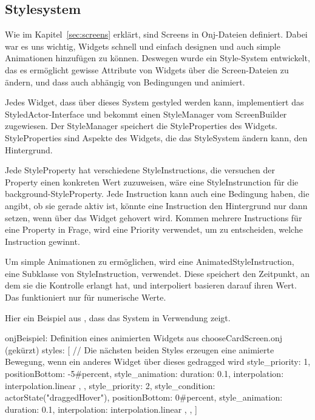 
\subsection{Stylesystem}\label{subsec:stylesystem}

\renewcommand{\kapitelautor}{Autor: Marvin Kurka}

Wie im Kapitel~\ref{sec:screens} erklärt, sind Screens in Onj-Dateien definiert.
Dabei war es uns wichtig, Widgets schnell und einfach designen und auch simple Animationen hinzufügen zu können.
Deswegen wurde ein Style-System entwickelt, das es ermöglicht gewisse Attribute von Widgets über die Screen-Dateien
zu ändern, und dass auch abhängig von Bedingungen und animiert.

Jedes Widget, dass über dieses System gestyled werden kann, implementiert das StyledActor-Interface und
bekommt einen StyleManager vom ScreenBuilder zugewiesen.
Der StyleManager speichert die StyleProperties des Widgets.
StyleProperties sind Aspekte des Widgets, die das StyleSystem ändern kann, \zB den Hintergrund.

Jede StyleProperty hat verschiedene StyleInstructions, die versuchen der Property einen konkreten Wert zuzuweisen,
\zB {} wäre eine StyleInstrunction für die background-StyleProperty.
Jede Instruction kann auch eine Bedingung haben, die angibt, ob sie gerade aktiv ist, \zB könnte eine Instruction
den Hintergrund nur dann setzen, wenn über das Widget gehovert wird.
Kommen mehrere Instructions für eine Property in Frage, wird eine Priority verwendet, um zu entscheiden, welche
Instruction gewinnt.

Um simple Animationen zu ermöglichen, wird eine AnimatedStyleInstruction, eine Subklasse von StyleInstruction, verwendet.
Diese speichert den Zeitpunkt, an dem sie die Kontrolle erlangt hat, und interpoliert basieren darauf ihren Wert.
Das funktioniert nur für numerische Werte.

Hier ein Beispiel aus , dass das System in Verwendung zeigt.

\begin{codeBlock}{onj}{Beispiel: Definition eines animierten Widgets aus chooseCardScreen.onj (gekürzt)}
styles: [
    // Die nächsten beiden Styles erzeugen eine animierte Bewegung, wenn ein anderes Widget über dieses gedragged wird
    {
        style_priority: 1,
        positionBottom: -5#percent,
        style_animation: {
            duration: 0.1,
            interpolation: interpolation.linear
        },
    },
    {
        style_priority: 2,
        style_condition: actorState("draggedHover"),
        positionBottom: 0#percent,
        style_animation: {
            duration: 0.1,
            interpolation: interpolation.linear
        },
    },
]
\end{codeBlock}

